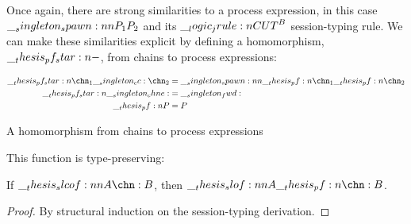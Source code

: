 Once again, there are strong similarities to a process expression, in this case $\__singleton_spawn:nn {P_1} {P_2}$ and its $\__logic_jrule:n {CUT}^B$ session-typing rule.
We can make these similarities explicit by defining a homomorphism, $\pf*{-}$, from chains to process expressions:
\begin{marginfigure}
  \begin{align*}
    \pf*{\chn_1 \cc \chn_2} &= \spawn{\pf{\chn_1}}{\pf{\chn_2}} \\
    \pf*{\chne} &= \fwd \\
    \pf{P} &= P
  \end{align*}
  \caption{A homomorphism from chains to process expressions}
\end{marginfigure}%
%
This function is type-preserving:
\begin{theorem}
  If $\slcof{A |- \chn : B}$, then $\slof{A |- \pf{\chn} : B}$.
\end{theorem}
\begin{proof}
  By structural induction on the session-typing derivation.
\end{proof}



 

 
